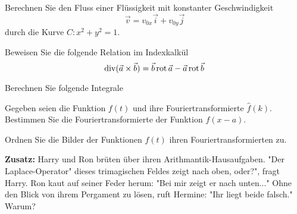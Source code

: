 \documentclass{atistandalonetask}
\begin{document}
\begin{atiTask}[
	title = Weitere Fragen
]
	\providecommand{\D}{\mathrm{d}}

\begin{atiSubtasks}
	\item Berechnen Sie den Fluss einer Flüssigkeit mit konstanter Geschwindigkeit 
	\[
	\vec{v}=v_{0x}\vec{i}+v_{0y}\vec{j}
	\]
	durch die Kurve $C: x^2+y^2=1$.
	\item Beweisen Sie die folgende Relation im Indexkalkül
	\[\operatorname{div}(\vec{a}\times\vec{b})=\vec{b}\operatorname{rot} \vec{a}-\vec{a}\operatorname{rot}\vec{b}
	\]
	\item Berechnen Sie folgende Integrale
	\begin{atiSubequations}
		\item{}
		\item{}
	    \item{}
	    \item{}
	    \item{}
	\end{atiSubequations}
	\item Gegeben seien die Funktion $f(t)$ und ihre Fouriertransformierte $\hat{f}(k)$. Bestimmen Sie die Fouriertransformierte der Funktion $f(x-a)$.
	\item Ordnen Sie die Bilder der Funktionen $f(t)$ ihren Fouriertransformierten zu.
	\item \textbf{Zusatz:} Harry und Ron brüten über ihren Arithmantik-Hausaufgaben. "Der Laplace-Operator" dieses trimagischen Feldes zeigt nach oben, oder?", fragt Harry. Ron kaut auf seiner Feder herum: "Bei mir zeigt er nach unten..." Ohne den Blick von ihrem Pergament zu lösen, ruft Hermine: "Ihr liegt beide falsch." Warum?
\end{atiSubtasks}

\end{atiTask}
\end{document}
